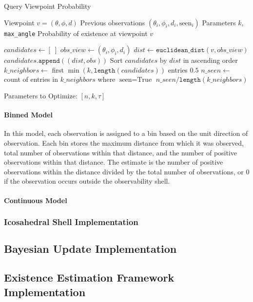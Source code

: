 \begin{minipage}{0.46\textwidth}
    \begin{algorithm}[H]
        \caption{Query Viewpoint Probability}
        \label{alg:query}
        \begin{tiny}
            \begin{algorithmic}
                \Require Viewpoint $v = (\theta, \phi, d)$
                \Require Previous observations $(\theta_i, \phi_i, d_i, \text{seen}_i)$
                \Require Parameters $k$, \texttt{max\_angle}
                \Ensure Probability of existence at viewpoint $v$

                \State $candidates \gets [\;]$
                \State $obs\_view \gets (\theta_i, \phi_i, d_i)$
                \State $dist \gets \texttt{euclidean\_dist}(v, obs\_view)$
                \State $candidates.\texttt{append}((dist, obs))$
                \EndIf
                \EndFor
                \State Sort $candidates$ by $dist$ in ascending order
                \State $k\_neighbors \gets$ first $\min(k, \texttt{length}(candidates))$ entries
                \State \Return $0.5$
                \EndIf
                \State $n\_seen \gets$ count of entries in $k\_neighbors$ where $\text{seen} = \text{True}$
                \State \Return $n\_seen / \texttt{length}(k\_neighbors)$
            \end{algorithmic}
        \end{tiny}
    \end{algorithm}
\end{minipage}

Parameters to Optimize: $[n, k, \tau]$

\paragraph{Binned Model}

In this model, each observation is assigned to a bin based on the unit direction of observation. Each bin stores the maximum distance from which it was observed, total number of observations within that distance, and the number of positive observations within that distance. The estimate is the number of positive observations within the distance divided by the total number of observations, or 0 if the observation occurs outside the observability shell.

\paragraph{Continuous Model}

\subsubsection{Icosahedral Shell Implementation}
\label{sec:icos_construction}

\subsection{Bayesian Update Implementation}

\subsection{Existence Estimation Framework Implementation}